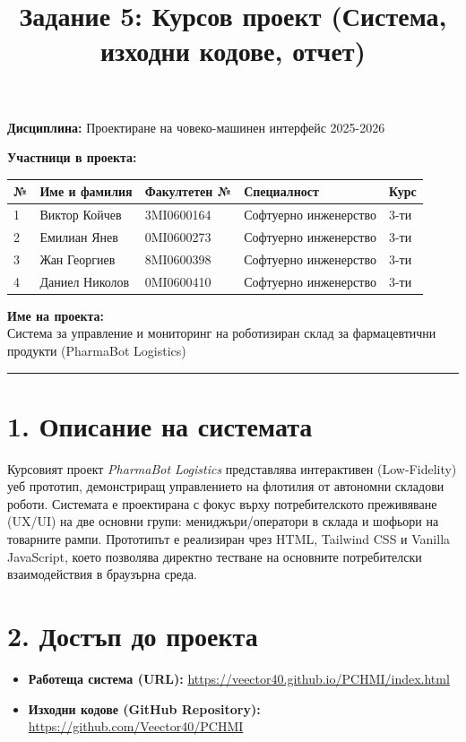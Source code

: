 \documentclass[12pt, a4paper]{article}
\title{Задание 5: Курсов проект (Система, изходни кодове, отчет)}
\author{}
\date{}
\begin{document}
\maketitle

\noindent\textbf{Дисциплина:} Проектиране на човеко-машинен интерфейс 2025-2026

\bigskip

\noindent\textbf{Участници в проекта:}
\smallskip

\noindent
\begin{tabularx}{\textwidth}{|l|X|l|X|l|}
\hline
\textbf{№} & \textbf{Име и фамилия} & \textbf{Факултетен №} & \textbf{Специалност} & \textbf{Курс} \\ \hline
1 & Виктор Койчев & 3MI0600164 & Софтуерно инженерство & 3-ти \\ \hline
2 & Емилиан Янев & 0MI0600273 & Софтуерно инженерство & 3-ти \\ \hline
3 & Жан Георгиев & 8MI0600398 & Софтуерно инженерство & 3-ти \\ \hline
4 & Даниел Николов & 0MI0600410 & Софтуерно инженерство & 3-ти \\ \hline
\end{tabularx}

\bigskip

\noindent\textbf{Име на проекта:}\\
Система за управление и мониторинг на роботизиран склад за фармацевтични продукти (PharmaBot Logistics)

\bigskip
\rule{\textwidth}{0.4pt}

\section*{1. Описание на системата}
Курсовият проект \textit{PharmaBot Logistics} представлява интерактивен (Low-Fidelity) уеб прототип, демонстриращ управлението на флотилия от автономни складови роботи. Системата е проектирана с фокус върху потребителското преживяване (UX/UI) на две основни групи: мениджъри/оператори в склада и шофьори на товарните рампи. Прототипът е реализиран чрез HTML, Tailwind CSS и Vanilla JavaScript, което позволява директно тестване на основните потребителски взаимодействия в браузърна среда.

\section*{2. Достъп до проекта}

\begin{itemize}
    \item \textbf{Работеща система (URL):} \url{https://veector40.github.io/PCHMI/index.html}
    \item \textbf{Изходни кодове (GitHub Repository):} \url{https://github.com/Veector40/PCHMI}
\end{itemize}
\end{document}

